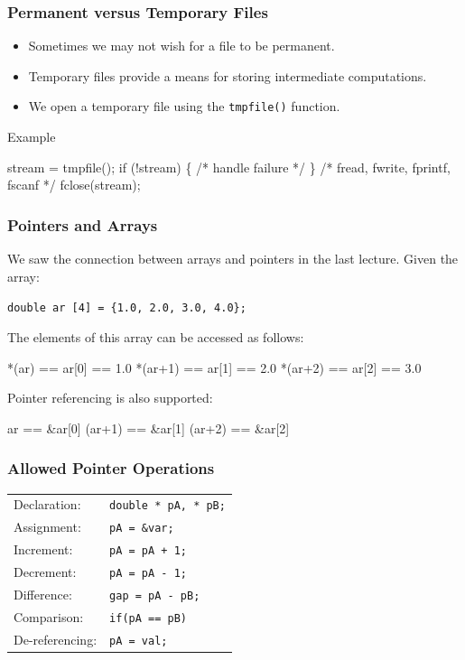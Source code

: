 \documentclass[table]{beamer}
\newif\ifschigh\schighfalse
\newcommand{\kw}[1]{\ifschigh\textcolor{red}{#1}\else\textcolor{keyword}{#1}\fi}
\newcommand{\kc}[1]{\ifschigh\textcolor{red}{#1}\else\textcolor{comment}{#1}\fi}
\begin{document}
\begin{frame}[fragile]
\frametitle{Permanent versus Temporary Files}
\begin{itemize}
\item Sometimes we may not wish for a file to be permanent.
\item Temporary files provide a means for storing intermediate computations.
\item We open a temporary file using the {\tt tmpfile()} function.
\end{itemize}
\begin{block}{Example}
\begin{semiverbatim}
stream = tmpfile();
\kw{if} (!stream)
\{
\kc{/* handle failure */}
\}
\kc{/* fread, fwrite, fprintf, fscanf */}
fclose(stream);
\end{semiverbatim}
\end{block}
\end{frame}

\begin{frame}[fragile]
\frametitle{Pointers and Arrays}
We saw the connection between arrays and pointers in the last lecture. Given the array:
\begin{center}
\tt \kw{double} ar [4] = \{1.0, 2.0, 3.0, 4.0\};
\end{center}
The elements of this array can be accessed as follows:
\begin{semiverbatim}
      *(ar) == ar[0] == 1.0
    *(ar+1) == ar[1] == 2.0
    *(ar+2) == ar[2] == 3.0
\end{semiverbatim}
Pointer referencing is also supported:
\begin{semiverbatim}
        ar == \&ar[0]
    (ar+1) == \&ar[1]
    (ar+2) == \&ar[2]
\end{semiverbatim}
\end{frame}

\begin{frame}
\frametitle{Allowed Pointer Operations}
\begin{tabular}{l l}
Declaration:&{\tt \kw{double} * pA, * pB;}\\
Assignment:&{\tt pA = \&var;}\\
Increment:&{\tt pA = pA + 1;}\\
Decrement:&{\tt pA = pA - 1;}\\
Difference:&{\tt gap = pA - pB;}\\
Comparison:&{\tt \kw{if}(pA == pB)}\\
De-referencing:&{\tt *pA = val;}
\end{tabular}
\end{frame}
\end{document}

